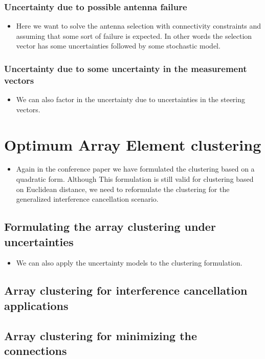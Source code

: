 \documentclass[journal]{IEEEtran}
\begin{document}
\subsubsection{Uncertainty due to possible antenna failure} 
\begin{itemize}
\item Here we want to solve the antenna selection with connectivity constraints and assuming that some sort of failure is expected. In other words the selection vector has some uncertainties followed by some stochastic model.  
\end{itemize}
\subsubsection{Uncertainty due to some uncertainty in the measurement vectors} 
\begin{itemize}
\item We can also factor in the uncertainty due to uncertainties in the steering vectors.
\end{itemize}
\section{Optimum Array Element clustering}\label{sec:Opt_clustering}
\begin{itemize}
\item Again in the conference paper we have formulated the clustering based on a quadratic form. Although This formulation is still valid for clustering based on Euclidean distance, we need to reformulate the clustering for the generalized interference cancellation scenario.
\end{itemize}
\subsection{Formulating the array clustering under uncertainties} 
\begin{itemize}
\item We can also apply the uncertainty models to the clustering formulation.
\end{itemize}
\subsection{Array clustering for interference cancellation applications} 
\subsection{Array clustering for minimizing the connections} 
\end{document}
